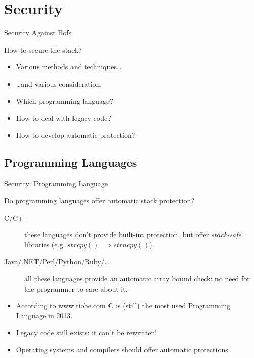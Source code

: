 \section{Security}
\begin{frame}{Security Against Bofs}
	\begin{block}{How to secure the stack?}
		\begin{itemize}
			\item Various methods and techniques\ldots
			\item \ldots{}and various consideration.
			\item Which programming language?
			\item How to deal with legacy code?
			\item How to develop automatic protection?
		\end{itemize}
	\end{block}
\end{frame}

\subsection{Programming Languages}
\begin{frame}{Security: Programming Language}
	\begin{block}{Do programming languages offer automatic stack protection?}
		\begin{description}
			\item[C/C++]these languages don't provide built-int protection, but offer
				\emph{stack-safe} libraries (e.g. $strcpy() \implies strncpy()$).
			\item[Java/.NET/Perl/Python/Ruby/\ldots]all these languages provide an
				automatic array bound check: no need for the programmer to care about it.
		\end{description}
		\begin{itemize}
			\item According to \url{www.tiobe.com} C is (still) the most used Programming Language in 2013.
			\item \alert{Legacy code still exists: it can't be rewritten!}
			\item Operating systems and compilers should offer automatic protections.
		\end{itemize}
	\end{block}
\end{frame}


